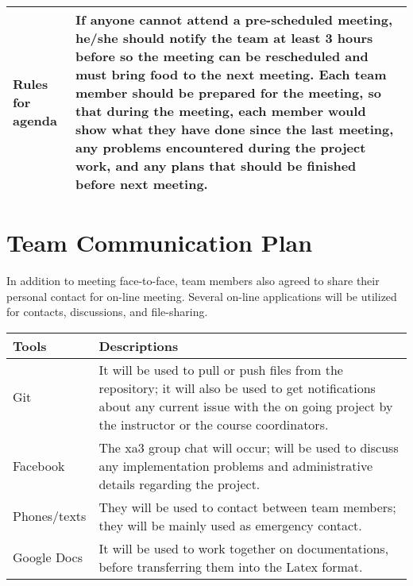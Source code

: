 \documentclass{article}
\begin{document}
\begin{tabular}{|p{3cm}|p{8cm}|}
Rules for agenda & If anyone cannot attend a pre-scheduled meeting, he/she should notify the team at least 3 hours before so the meeting can be rescheduled and must bring food to the next meeting. Each team member should be prepared for the meeting, so that during the meeting, each member would show what they have done since the last meeting, any problems encountered during the project work, and any plans that should be finished before next meeting.  \\ \hline
\end{tabular}




\section {Team Communication Plan} 

In addition to meeting face-to-face, team members also agreed to share their personal contact for on-line meeting. Several on-line applications will be utilized for contacts, discussions, and file-sharing. 

\begin{tabular}{|p{3cm}|p{8cm}|}
\hline
\textbf{Tools}    & \textbf{Descriptions}                                                                                                                                                                                                                                                                                                                                                                                                                                \\\hline
Git        & It will be used to pull or push files from the repository; it will also be used to get notifications about any current issue with the on going project by the instructor or the course coordinators. \\\hline
Facebook    & The xa3 group chat will occur; will be used to discuss any implementation problems and administrative details regarding the project. \\\hline
Phones/texts   & They will be used to contact between team members; they will be mainly used as emergency contact. \\\hline
Google Docs   & It will be used to work together on documentations, before transferring them into the Latex format. \\\hline
\end{tabular}
\end{document}
